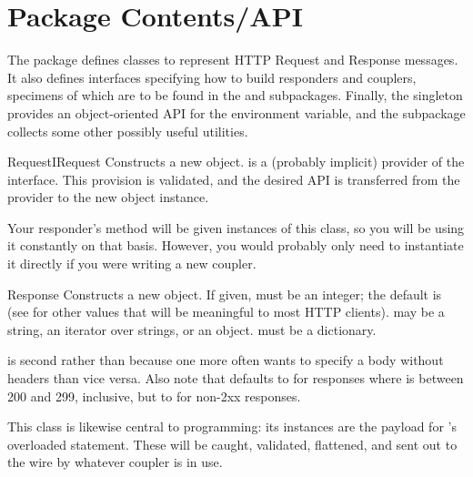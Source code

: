 \chapter{Package Contents/API \label{api}}

The  package defines classes to represent HTTP Request and
Response messages. It also defines interfaces specifying how to build responders
and couplers, specimens of which are to be found in the  and
 subpackages. Finally, the  singleton provides an
object-oriented API for the  environment variable, and the
 subpackage collects some other possibly useful utilities.



\begin{classdesc}{Request}{IRequest}
Constructs a new  object.  is a (probably implicit)
provider of the  interface. This provision is validated, and the
desired API is transferred from the  provider to the new object
instance.

Your responder's  method will be given instances of this class,
so you will be using it constantly on that basis. However, you would probably
only need to instantiate it directly if you were writing a new coupler.
\end{classdesc}



\begin{classdesc}{Response}{  }
Constructs a new  object. If given,  must be
an integer; the default is
(see  for other values that will be meaningful to most HTTP clients). 
may be a string, an iterator over strings, or an 
object.  must be a dictionary.

 is second rather than  because one more often wants to
specify a body without headers than vice versa. Also note that
 defaults to  for responses where
 is between 200 and 299, inclusive, but to  for
non-2xx responses.

This class is likewise central to  programming: its instances are
the payload for 's overloaded  statement. These will
be caught, validated, flattened, and sent out to the wire by whatever coupler is
in use.
\end{classdesc}








